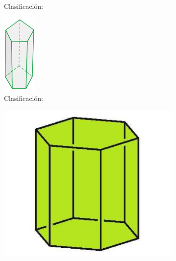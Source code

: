 \begin{figure}[H]
\begin{subfigure}{.25\linewidth}
        \caption{Clasificación:\\}
        \label{sfig:sinma2_aiu3_ac79_img08}
    \end{subfigure}\qquad
    \begin{subfigure}{.18\linewidth}
        \centering
        \includegraphics[width=.5\linewidth]{../images/sinma2_aiu3_ac79_img09}
        \caption{Clasificación:\\}
        \label{sfig:sinma2_aiu3_ac79_img09}
    \end{subfigure}
    \qquad
    \begin{subfigure}{.18\linewidth}
        \centering
        \includegraphics[width=\linewidth]{../images/sinma2_aiu3_ac79_img10}

\end{subfigure}
\end{figure}
